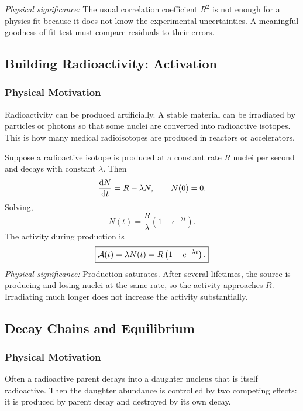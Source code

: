 \textit{Physical significance:} The usual correlation coefficient \(R^2\) is
not enough for a physics fit because it does not know the experimental
uncertainties.  A meaningful goodness-of-fit test must compare residuals to
their errors.

\subsection{Building Radioactivity: Activation}
\label{subsec:lec05:activation}

\subsubsection*{Physical Motivation}
Radioactivity can be produced artificially.  A stable material can be irradiated
by particles or photons so that some nuclei are converted into radioactive
isotopes.  This is how many medical radioisotopes are produced in reactors or
accelerators.

Suppose a radioactive isotope is produced at a constant rate \(R\) nuclei per
second and decays with constant \(\lambda\).  Then
\begin{equation}
  \label{eq:lec05:activation_differential}
  \dv{N}{t}=R-\lambda N,\qquad N(0)=0.
\end{equation}
Solving,
\begin{equation}
  \label{eq:lec05:activation_solution}
  \boxed{N(t)=\frac{R}{\lambda}\left(1-e^{-\lambda t}\right).}
\end{equation}
The activity during production is
\begin{equation}
  \label{eq:lec05:activation_activity}
  \boxed{\mathcal{A}(t)=\lambda N(t)=R\left(1-e^{-\lambda t}\right).}
\end{equation}
\textit{Physical significance:} Production saturates.  After several lifetimes,
the source is producing and losing nuclei at the same rate, so the activity
approaches \(R\).  Irradiating much longer does not increase the activity
substantially.

\subsection{Decay Chains and Equilibrium}
\label{subsec:lec05:decay_chains}

\subsubsection*{Physical Motivation}
Often a radioactive parent decays into a daughter nucleus that is itself
radioactive.  Then the daughter abundance is controlled by two competing
effects: it is produced by parent decay and destroyed by its own decay.

